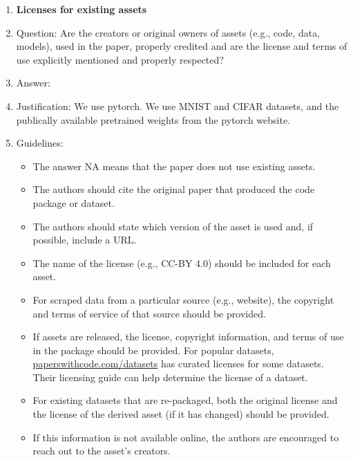 \documentclass{article}
\theoremstyle{plain}
\begin{document}
\begin{enumerate}
\item {\bf Licenses for existing assets}
    \item[] Question: Are the creators or original owners of assets (e.g., code, data, models), used in the paper, properly credited and are the license and terms of use explicitly mentioned and properly respected?
     \item[] Answer: \answerYes{} %
    \item[] Justification: We use pytorch. We use MNIST and CIFAR datasets, and the publically available pretrained weights from the pytorch website.
    \item[] Guidelines:
    \begin{itemize}
        \item The answer NA means that the paper does not use existing assets.
        \item The authors should cite the original paper that produced the code package or dataset.
        \item The authors should state which version of the asset is used and, if possible, include a URL.
        \item The name of the license (e.g., CC-BY 4.0) should be included for each asset.
        \item For scraped data from a particular source (e.g., website), the copyright and terms of service of that source should be provided.
        \item If assets are released, the license, copyright information, and terms of use in the package should be provided. For popular datasets, \url{paperswithcode.com/datasets} has curated licenses for some datasets. Their licensing guide can help determine the license of a dataset.
        \item For existing datasets that are re-packaged, both the original license and the license of the derived asset (if it has changed) should be provided.
        \item If this information is not available online, the authors are encouraged to reach out to the asset's creators.
    \end{itemize}


\end{enumerate}
\end{document}
